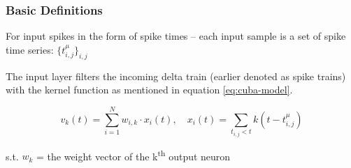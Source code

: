 \subsubsection{Basic Definitions}

For input spikes in the form of spike times – each input sample is a set of spike time series:
\( \lbrace{t_{i,j}^{\mu}} \rbrace_{i, j}\) 

The input layer filters the incoming delta train (earlier denoted as spike trains) with the kernel function as mentioned in equation \ref{eq:cuba-model}.

\begin{equation}
    v_k(t) = \sum_{i=1}^{N} w_{i,k} \cdot x_i(t), \quad x_i(t) = \sum_{t_{i,j} < t} k(t - t_{i,j}^{\mu})
\end{equation}

s.t. \(w_k\) = the weight vector of the k\textsuperscript{th} output neuron

